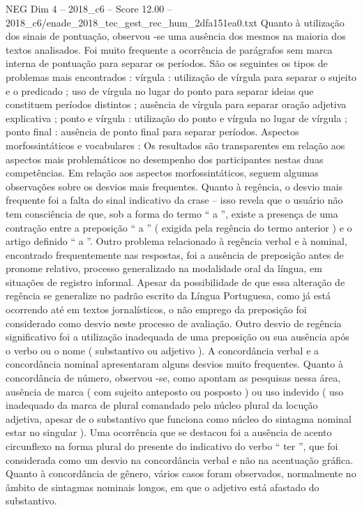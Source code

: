 \begin{textsample}{NEG Dim 4 – 2018\_c6 – Score 12.00 – 2018\_c6/enade\_2018\_tec\_gest\_rec\_hum\_2dfa151ea0.txt}
Quanto à utilização dos sinais de pontuação, observou -se uma ausência dos mesmos na maioria dos textos analisados.
Foi muito frequente a ocorrência de parágrafos sem marca interna de pontuação para separar os períodos.
São os seguintes os tipos de problemas mais encontrados : vírgula : utilização de vírgula para separar o sujeito e o predicado ; uso de vírgula no lugar do ponto para separar ideias que constituem períodos distintos ; ausência de vírgula para separar oração adjetiva explicativa ; ponto e vírgula : utilização do ponto e vírgula no lugar de vírgula ; ponto final : ausência de ponto final para separar períodos.
Aspectos morfossintáticos e vocabulares : Os resultados são transparentes em relação aos aspectos mais problemáticos no desempenho dos participantes nestas duas competências.
Em relação aos aspectos morfossintáticos, seguem algumas observações sobre os desvios mais frequentes.
Quanto à regência, o desvio mais frequente foi a falta do sinal indicativo da crase – isso revela que o usuário não tem consciência de que, sob a forma do termo “ a ”, existe a presença de uma contração entre a preposição “ a ” ( exigida pela regência do termo anterior ) e o artigo definido “ a ”.
Outro problema relacionado à regência verbal e à nominal, encontrado frequentemente nas respostas, foi a ausência de preposição antes de pronome relativo, processo generalizado na modalidade oral da língua, em situações de registro informal.
Apesar da possibilidade de que essa alteração de regência se generalize no padrão escrito da Língua Portuguesa, como já está ocorrendo até em textos jornalísticos, o não emprego da preposição foi considerado como desvio neste processo de avaliação.
Outro desvio de regência significativo foi a utilização inadequada de uma preposição ou sua ausência após o verbo ou o nome ( substantivo ou adjetivo ).
A concordância verbal e a concordância nominal apresentaram alguns desvios muito frequentes.
Quanto à concordância de número, observou -se, como apontam as pesquisas nessa área, ausência de marca ( com sujeito anteposto ou posposto ) ou uso indevido ( uso inadequado da marca de plural comandado pelo núcleo plural da locução adjetiva, apesar de o substantivo que funciona como núcleo do sintagma nominal estar no singular ).
Uma ocorrência que se destacou foi a ausência de acento circunflexo na forma plural do presente do indicativo do verbo “ ter ”, que foi considerada como um desvio na concordância verbal e não na acentuação gráfica.
Quanto à concordância de gênero, vários casos foram observados, normalmente no âmbito de sintagmas nominais longos, em que o adjetivo está afastado do substantivo.

\end{textsample}
